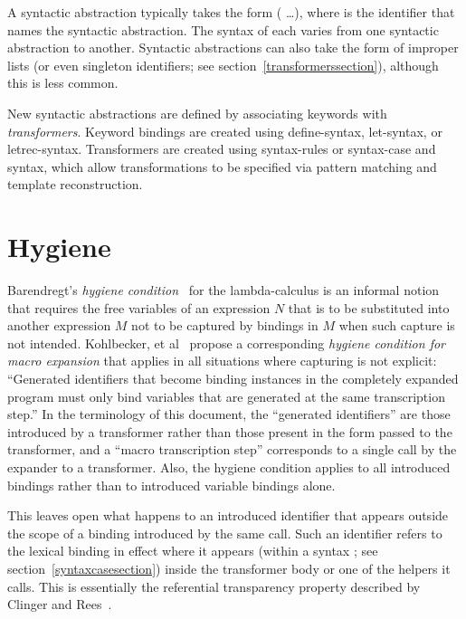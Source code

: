A syntactic abstraction typically takes the form
{\cf (  \dots)}, where  is the
identifier that names the syntactic abstraction.
The syntax of each  varies from one syntactic abstraction to
another.
Syntactic abstractions can also take the form of improper lists (or even
singleton identifiers; see section~\ref{transformerssection}), although this is
less common.

New syntactic abstractions are defined by associating keywords with
\emph{transformers}.
Keyword bindings are created using {\cf define-syntax},
{\cf let-syntax}, or {\cf letrec-syntax}.
Transformers are created using {\cf syntax-rules} or
{\cf syntax-case} and {\cf syntax}, which allow transformations to
be specified via pattern matching and template reconstruction.

\section{Hygiene}
\label{hygienesection}


Barendregt's \emph{hygiene condition}~\cite{barendregt} for the
lambda-calculus is an informal notion that requires the free variables of
an expression $N$ that is to be substituted into another expression $M$ not to
be captured by bindings in $M$ when such capture is not intended.
Kohlbecker, et al~\cite{hygienic} propose a corresponding
\emph{hygiene condition for macro expansion} that applies in all situations
where capturing is not explicit:
``Generated identifiers that become binding instances in
the completely expanded program must only bind variables that
are generated at the same transcription step.''
In the terminology of this document, the ``generated identifiers'' are
those introduced by a transformer rather than those present in the form
passed to the transformer, and a ``macro transcription step'' corresponds
to a single call by the expander to a transformer.
Also, the hygiene condition applies to all introduced bindings rather than
to introduced variable bindings alone.

This leaves open what happens to an introduced identifier that appears
outside the scope of a binding introduced by the same call.
Such an identifier refers to the lexical binding in effect where it
appears (within a {\cf syntax} ;
see section~\ref{syntaxcasesection}) inside the transformer body or one of
the helpers it calls.
This is essentially the referential transparency property described
by Clinger and Rees~\cite{macrosthatwork}.


